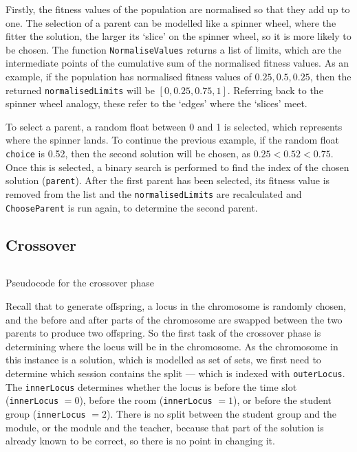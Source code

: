 \documentclass[a4paper, 12pt]{report}
\begin{document}
Firstly, the fitness values of the population are normalised so that they add 
up to one. The selection of a parent can be modelled like a spinner wheel, where
the fitter the solution, the larger its `slice' on the spinner wheel, so it is 
more likely to be chosen.
The function \verb|NormaliseValues| returns a list of limits, which are the 
intermediate points of the cumulative sum of the normalised fitness values.
As an example, if the population has normalised fitness values of 
\( 0.25,0.5,0.25 \), then the returned \verb|normalisedLimits| will be 
\( [0,0.25,0.75,1] \).
Referring back to the spinner wheel analogy, these refer to the `edges' where 
the `slices' meet.

To select a parent, a random float between 0 and 1 is selected, which represents
where the spinner lands.
To continue the previous example, if the random float \verb|choice| is 0.52, 
then the second solution will be chosen, as \( 0.25 < 0.52 < 0.75 \).
Once this is selected, a binary search is performed to find the index of the 
chosen solution (\verb|parent|). After the first parent has been selected, its 
fitness value is removed from the list and the \verb|normalisedLimits| are 
recalculated and \verb|ChooseParent| is run again, to determine the second 
parent.

\newpage

\subsection{Crossover}

\begin{listing}[!ht]
	\inputminted[linenos, fontsize=\footnotesize]{text}{code/crossover.txt}
	\caption{Pseudocode for the crossover phase}
	\label{listing:crossover}
\end{listing}

Recall that to generate offspring, a locus in the chromosome is randomly chosen,
and the before and after parts of the chromosome are swapped between the two 
parents to produce two offspring.
So the first task of the crossover phase is determining where the locus will be 
in the chromosome.
As the chromosome in this instance is a solution, which is modelled as set of 
sets, we first need to determine which session contains the split --- which is 
indexed with \verb|outerLocus|.
The \verb|innerLocus| determines whether the locus is before the time slot
(\verb|innerLocus| \( = 0\)), before the room (\verb|innerLocus| \( = 1 \)), or
before the student group (\verb|innerLocus| \(=2\)). There is no split between
the student group and the module, or the module and the teacher, because that 
part of the solution is already known to be correct, so there is no point in
changing it.
\end{document}

